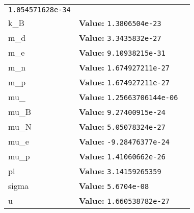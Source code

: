 \begin{longtable}{|p{\varnamewidth}|p{\vardescrwidth}|l}
{\tt 1.054571628e-34}&\\
\cline{1-2}
\raggedright k\-\_\-B\- & \raggedright \textbf{Value:} 
{\tt 1.3806504e-23}&\\
\cline{1-2}
\raggedright m\-\_\-d\- & \raggedright \textbf{Value:} 
{\tt 3.3435832e-27}&\\
\cline{1-2}
\raggedright m\-\_\-e\- & \raggedright \textbf{Value:} 
{\tt 9.10938215e-31}&\\
\cline{1-2}
\raggedright m\-\_\-n\- & \raggedright \textbf{Value:} 
{\tt 1.674927211e-27}&\\
\cline{1-2}
\raggedright m\-\_\-p\- & \raggedright \textbf{Value:} 
{\tt 1.674927211e-27}&\\
\cline{1-2}
\raggedright m\-u\-\_\-0\- & \raggedright \textbf{Value:} 
{\tt 1.25663706144e-06}&\\
\cline{1-2}
\raggedright m\-u\-\_\-B\- & \raggedright \textbf{Value:} 
{\tt 9.27400915e-24}&\\
\cline{1-2}
\raggedright m\-u\-\_\-N\- & \raggedright \textbf{Value:} 
{\tt 5.05078324e-27}&\\
\cline{1-2}
\raggedright m\-u\-\_\-e\- & \raggedright \textbf{Value:} 
{\tt -9.28476377e-24}&\\
\cline{1-2}
\raggedright m\-u\-\_\-p\- & \raggedright \textbf{Value:} 
{\tt 1.41060662e-26}&\\
\cline{1-2}
\raggedright p\-i\- & \raggedright \textbf{Value:} 
{\tt 3.14159265359}&\\
\cline{1-2}
\raggedright s\-i\-g\-m\-a\- & \raggedright \textbf{Value:} 
{\tt 5.6704e-08}&\\
\cline{1-2}
\raggedright u\- & \raggedright \textbf{Value:} 
{\tt 1.660538782e-27}&\\
\cline{1-2}
\end{longtable}

